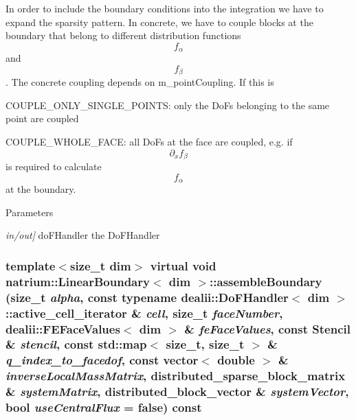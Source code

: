 In order to include the boundary conditions into the integration we have to expand the sparsity pattern. In concrete, we have to couple blocks at the boundary that belong to different distribution functions \[ f_{\alpha} \] and \[ f_{\beta} \]. The concrete coupling depends on m\_\-pointCoupling. If this is
\begin{DoxyItemize}
\item COUPLE\_\-ONLY\_\-SINGLE\_\-POINTS: only the DoFs belonging to the same point are coupled
\item COUPLE\_\-WHOLE\_\-FACE: all DoFs at the face are coupled, e.g. if \[ \partial_{x}f_{\beta} \] is required to calculate \[ f_{\alpha} \] at the boundary. 
\end{DoxyItemize}
\begin{DoxyParams}{Parameters}
\item[{\em in/out\mbox{]}}]doFHandler the DoFHandler \end{DoxyParams}
\hypertarget{classnatrium_1_1LinearBoundary_a669905b997cb9f78f8789254e28ec538}{
\subsubsection[{assembleBoundary}]{\setlength{\rightskip}{0pt plus 5cm}template$<$size\_\-t dim$>$ virtual void {\bf natrium::LinearBoundary}$<$ dim $>$::assembleBoundary (size\_\-t {\em alpha}, \/  const typename dealii::DoFHandler$<$ dim $>$::active\_\-cell\_\-iterator \& {\em cell}, \/  size\_\-t {\em faceNumber}, \/  dealii::FEFaceValues$<$ dim $>$ \& {\em feFaceValues}, \/  const {\bf Stencil} \& {\em stencil}, \/  const std::map$<$ size\_\-t, size\_\-t $>$ \& {\em q\_\-index\_\-to\_\-facedof}, \/  const vector$<$ double $>$ \& {\em inverseLocalMassMatrix}, \/  distributed\_\-sparse\_\-block\_\-matrix \& {\em systemMatrix}, \/  distributed\_\-block\_\-vector \& {\em systemVector}, \/  bool {\em useCentralFlux} = {\ttfamily false}) const}}
\label{classnatrium_1_1LinearBoundary_a669905b997cb9f78f8789254e28ec538}


